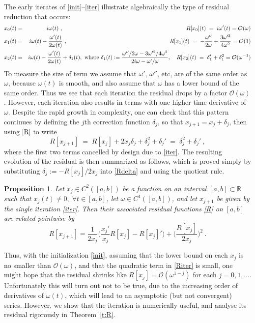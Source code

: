 \documentclass[10pt]{article}
\newcommand{\be}{\begin{equation}}
\newcommand{\ee}{\end{equation}}
\newcommand{\bea}{\begin{eqnarray}}
\newcommand{\eea}{\end{eqnarray}}
\newcommand{\R}{\mathbb{R}}
\newcommand{\bigO}{{\mathcal O}}
\newtheorem{pro}[thm]{Proposition}
\newcommand{\om}{\omega}
\begin{document}
The early iterates of \eqref{init}--\eqref{iter} illustrate
algebraically
the type of residual reduction that occurs:
\bea
x_0(t) &=&  i\om(t)~, \hspace{3.0in} R[x_0](t) \; = \; i\om'(t) = \bigO(\om)
 \nonumber
\\
x_1(t) &=& i\om(t) - \frac{\om'(t)}{2\om(t)}~,
\hspace{2.5in} R[x_1](t) \; = \; -\frac{\om''}{2\om} + \frac{3\om'^2}{4\om^2}
= \bigO(1)
 \nonumber
\\
x_2(t) &=& i\om(t) - \frac{\om'(t)}{2\om(t)} + \delta_1(t),
\mbox{ where }
\delta_1(t):=\frac{\om''/2\om - 3\om'^2/4\om^2}{2i\om - \om'/\om}
,
\quad R[x_2](t) \; = \; \delta_1' + \delta_1^2 = \bigO(\om^{-1})
\nonumber
\eea
To measure the size of term we assume that $\om'$, $\om''$, etc, are
of the same order as $\om$, because $\om(t)$ is smooth,
and also assume that $\om$ has a lower bound of the same order.
Thus we see that each iteration the residual drops by a factor $\bigO(\om)$.
However, each iteration also results in terms with
one higher time-derivative of $\om$.
Despite the rapid growth in complexity, one can check that this
pattern continues
by defining the $j$th correction function $\delta_j$,
so that $x_{j+1} = x_j + \delta_j$, then using \eqref{R} to write
\be
R[x_{j+1}] \;=\;
R[x_j] + 2x_j \delta_j + \delta_j^2 + \delta_j'
\;=\;
\delta_j^2 + \delta_j'
~,
\label{Rdelta}
\ee
where the first two terms cancelled by design due to \eqref{iter}.
The resulting evolution of the residual is then
summarized as follows, which is proved simply by
substituting $\delta_j := -R[x_j]/2x_j$ into \eqref{Rdelta} and using
the quotient rule.
\begin{pro}\label{p:Riter}
  Let $x_j \in C^2([a,b])$ be a function on an interval $[a,b]\subset \R$
  such that $x_j(t) \neq 0, \; \forall t\in [a,b]$,
  let $\om\in C^1([a,b])$,
  and let $x_{j+1}$ be given by the single iteration \eqref{iter}.
  Then their associated residual functions \eqref{R} on $[a,b]$
  are related pointwise by
  \be
  R[x_{j+1}] = \frac{1}{2x_j}\biggl(
  \frac{x_j'}{x_j} R[x_j]
  - R[x_j]'
    \biggr) + \biggl(\frac{R[x_j]}{2x_j}\biggr)^2~.
  \label{Riter}
  \ee
\end{pro}
Thus, with the initialization \eqref{init},
assuming that the lower bound on each $x_j$ is no smaller than $\bigO(\om)$,
and that the quadratic term in \eqref{Riter} is small,
one might hope that
the residual shrinks like $R[x_j] = \bigO(\om^{1-j})$ for each $j=0,1,\dots$.
Unfortunately this will turn out not to be true, due to the increasing
order of derivatives of $\om(t)$, which will lead to an
asymptotic (but not convergent) series.
However, we show that the iteration is numerically useful,
and analyse its residual rigorously in Theorem~\ref{t:R}.
\end{document}
